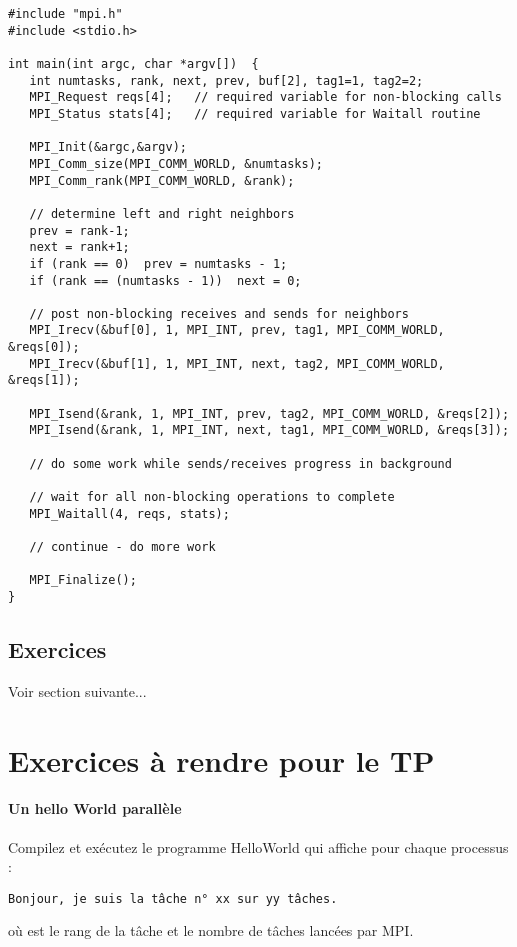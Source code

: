 \documentclass[11pt,a4paper]{article}
\begin{document}
\begin{lstlisting}[style=customcpp]
#include "mpi.h"
#include <stdio.h>

int main(int argc, char *argv[])  {
   int numtasks, rank, next, prev, buf[2], tag1=1, tag2=2;
   MPI_Request reqs[4];   // required variable for non-blocking calls
   MPI_Status stats[4];   // required variable for Waitall routine

   MPI_Init(&argc,&argv);
   MPI_Comm_size(MPI_COMM_WORLD, &numtasks);
   MPI_Comm_rank(MPI_COMM_WORLD, &rank);
   
   // determine left and right neighbors
   prev = rank-1;
   next = rank+1;
   if (rank == 0)  prev = numtasks - 1;
   if (rank == (numtasks - 1))  next = 0;

   // post non-blocking receives and sends for neighbors
   MPI_Irecv(&buf[0], 1, MPI_INT, prev, tag1, MPI_COMM_WORLD, &reqs[0]);
   MPI_Irecv(&buf[1], 1, MPI_INT, next, tag2, MPI_COMM_WORLD, &reqs[1]);

   MPI_Isend(&rank, 1, MPI_INT, prev, tag2, MPI_COMM_WORLD, &reqs[2]);
   MPI_Isend(&rank, 1, MPI_INT, next, tag1, MPI_COMM_WORLD, &reqs[3]);
  
   // do some work while sends/receives progress in background

   // wait for all non-blocking operations to complete
   MPI_Waitall(4, reqs, stats);
  
   // continue - do more work

   MPI_Finalize();
}
\end{lstlisting}

\subsection{Exercices}

Voir section suivante...


\section{Exercices à rendre pour le TP}

\paragraph{Un hello World parallèle}

Compilez et exécutez le programme HelloWorld qui affiche pour chaque processus :
\begin{verbatim}
Bonjour, je suis la tâche n° xx sur yy tâches.
\end{verbatim}
où \verb@xx@ est le rang de la tâche et \verb@yy@ le nombre de tâches lancées par MPI.
\end{document}
